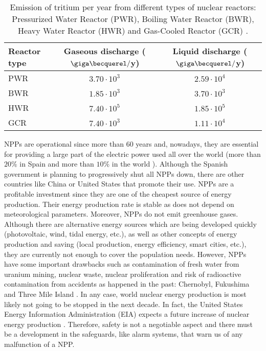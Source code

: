 \begin{table}[htbp]
\centering{}%
\begin{tabular}{lcc}
\toprule 
Reactor type & Gaseous discharge ($\giga\becquerel/$y) & Liquid discharge ($\giga\becquerel/$y)\tabularnewline
\midrule
\midrule 
PWR & $3.70\cdot 10^{3}$ & $2.59\cdot 10^{4}$ \tabularnewline
BWR & $1.85\cdot 10^{3}$ & $3.70\cdot 10^{3}$ \tabularnewline
HWR & $7.40\cdot 10^{5}$ & $1.85\cdot 10^{5}$ \tabularnewline
GCR & $7.40\cdot 10^{3}$ & $1.11\cdot 10^{4}$ \tabularnewline
\bottomrule
\end{tabular}
\caption{Emission of tritium per year from different types of nuclear reactors: Pressurized Water Reactor (PWR), Boiling Water Reactor (BWR), Heavy Water Reactor (HWR) and Gas-Cooled Reactor (GCR) \cite{CommonEmissionTritium}.}
\label{tab:TritiumEmisionsNPPs}
\end{table}

NPPs are operational since more than 60 years and, nowadays, they are essential for providing a large part of the electric power used all over the world (more than $20\%$ in Spain \cite{PercentageEnergySpain} and more than $10\%$ in the world \cite{PercentageEnergyWorld}). Although the Spanish government is planning to progressively shut all NPPs down, there are other countries like China \cite{60ReactorsChina} or United States \cite{35MillionsUSA} that promote their use. NPPs are a profitable investment since they are one of the cheapest source of energy production. Their energy production rate is stable as does not depend on meteorological parameters. Moreover, NPPs do not emit greenhouse gases. Although there are alternative energy sources which are being developed quickly (photovoltaic, wind, tidal energy, etc.), as well as other concepts of energy production and saving (local production, energy efficiency, smart cities, etc.), they are currently not enough to cover the population needs. However, NPPs have some important drawbacks such as contamination of fresh water from uranium mining, nuclear waste, nuclear proliferation and risk of radioactive contamination from accidents as happened in the past: Chernobyl, Fukushima and Three Mile Island \cite{ThreeMileIsland}. In any case, world nuclear energy production is most likely not going to be stopped in the next decade. In fact, the United States Energy Information Administration (EIA) expects a future increase of nuclear energy production \cite{EIAOutlook}. Therefore, safety is not a negotiable aspect and there must be a development in the safeguards, like alarm systems, that warn us of any malfunction of a NPP. 

